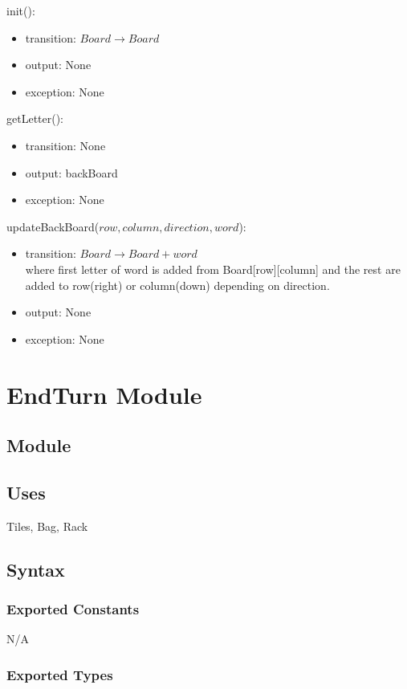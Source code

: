 \documentclass[12pt]{article}
\begin{document}
\noindent init():
\begin{itemize}
\item transition: $Board \rightarrow Board$ 
\item output: None
\item exception: None
\end{itemize}

\noindent getLetter():
\begin{itemize}
\item transition: None
\item output: backBoard
\item exception: None
\end{itemize}

\noindent updateBackBoard($row, column, direction, word$):
\begin{itemize}
\item transition: $Board \rightarrow Board + word$ \\
where first letter of word is added from Board[row][column] and the rest are added to row(right) or column(down) depending on direction.
\item output: None
\item exception: None
\end{itemize}

\newpage

\section* {EndTurn Module}

\subsection*{Module}

\subsection* {Uses}

Tiles, Bag, Rack

\subsection* {Syntax}

\subsubsection* {Exported Constants}
N/A
\subsubsection* {Exported Types}
\end{document}
